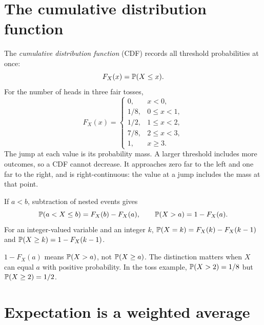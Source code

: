 \section{The cumulative distribution function}

The \emph{cumulative distribution function} (CDF) records all threshold
probabilities at once:
\[
 F_X(x)=\P(X\le x).
\]
For the number of heads in three fair tosses,
\[
 F_X(x)=
 \begin{cases}
 0,&x<0,\\
 1/8,&0\le x<1,\\
 1/2,&1\le x<2,\\
 7/8,&2\le x<3,\\
 1,&x\ge3.
 \end{cases}
\]
The jump at each value is its probability mass. A larger threshold
includes more outcomes, so a CDF cannot decrease. It approaches zero
far to the left and one far to the right, and is right-continuous:
the value at a jump includes the mass at that point.

\begin{center}
\end{center}

If $a<b$, subtraction of nested events gives
\[
 \P(a<X\le b)=F_X(b)-F_X(a),\qquad
 \P(X>a)=1-F_X(a).
\]
For an integer-valued variable and an integer $k$,
$\P(X=k)=F_X(k)-F_X(k-1)$ and
$\P(X\ge k)=1-F_X(k-1)$.

\begin{warningbox}
$1-F_X(a)$ means $\P(X>a)$, not $\P(X\ge a)$.
The distinction matters when $X$ can equal $a$ with positive probability.
In the toss example, $\P(X>2)=1/8$ but $\P(X\ge2)=1/2$.
\end{warningbox}

\section{Expectation is a weighted average}
\label{sec:discrete-expectation}

